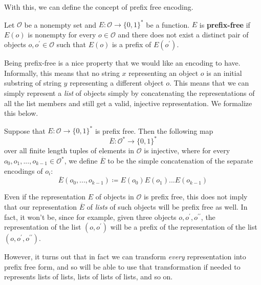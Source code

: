   With this, we can define the concept of prefix free encoding. 

  \begin{definition}
    \label{def:prefix-free-encoding}
  Let $\mathcal{O}$ be a nonempty set and $E: \mathcal{O} \to \{0,1\}^\ast$ be a function. $E$ is \textbf{prefix-free} if $E(o)$ is nonempty for every $o \in \mathcal{O}$ and there does not exist a distinct pair of objects $o, o^\prime \in \mathcal{O}$ such that $E(o)$ is a prefix of $E(o^\prime)$. 
  \end{definition}

  Being prefix-free is a nice property that we would like an encoding to have. Informally, this means that no string $x$ representing an object $o$ is an initial substring of string $y$ representing a different object $o$. This means that we can simply represent a \textit{list} of objects simply by concatenating the representations of all the list members and still get a valid, injective representation. We formalize this below.

  \begin{theorem}
    \label{thm:prefix-free-codes-encode-tuples-injectively}
  Suppose that $E: \mathcal{O} \to \{0,1\}^\ast$ is prefix free. Then the following map 
  \begin{equation}
    \overline{E}: \mathcal{O}^\ast \to \{0,1\}^\ast
  \end{equation}
  over all finite length tuples of elements in $\mathcal{O}$ is injective, where for every $o_0, o_1, ..., o_{k-1} \in \mathcal{O}^\ast$, we define $\overline{E}$ to be the simple concatenation of the separate encodings of $o_i$: 
  \begin{equation}
    \overline{E} (o_0, ..., o_{k-1}) \coloneqq E(o_0) E(o_1) ... E(o_{k-1})
  \end{equation}
  \end{theorem}

  Even if the representation $E$ of objects in $\mathcal{O}$ is prefix free, this does not imply that our representation $\overline{E}$ of \textit{lists} of such objects will be prefix free as well. In fact, it won't be, since for example, given three objects $o, o^\prime, o^{\prime\prime}$, the representation of the list $(o, o^\prime)$ will be a prefix of the representation of the list $(o, o^\prime, o^{\prime\prime})$.

  However, it turns out that in fact we can transform \textit{every} representation into prefix free form, and so will be able to use that transformation if needed to represents lists of lists, lists of lists of lists, and so on. 

